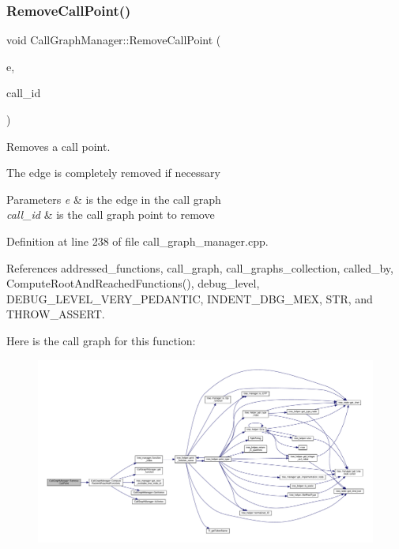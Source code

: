 \subsubsection{\texorpdfstring{Remove\+Call\+Point()}{RemoveCallPoint()}\hspace{0.1cm}{\footnotesize\ttfamily [2/2]}}
{\footnotesize\ttfamily void Call\+Graph\+Manager\+::\+Remove\+Call\+Point (\begin{DoxyParamCaption}\item[{\hyperlink{graph_8hpp_a9eb9afea34e09f484b21f2efd263dd48}{Edge\+Descriptor}}]{e,  }\item[{const unsigned int}]{call\+\_\+id }\end{DoxyParamCaption})}



Removes a call point. 


\begin{DoxyItemize}
\item The edge is completely removed if necessary 
\begin{DoxyParams}{Parameters}
{\em e} & is the edge in the call graph \\
\hline
{\em call\+\_\+id} & is the call graph point to remove \\
\hline
\end{DoxyParams}

\end{DoxyItemize}

Definition at line 238 of file call\+\_\+graph\+\_\+manager.\+cpp.



References addressed\+\_\+functions, call\+\_\+graph, call\+\_\+graphs\+\_\+collection, called\+\_\+by, Compute\+Root\+And\+Reached\+Functions(), debug\+\_\+level, D\+E\+B\+U\+G\+\_\+\+L\+E\+V\+E\+L\+\_\+\+V\+E\+R\+Y\+\_\+\+P\+E\+D\+A\+N\+T\+IC, I\+N\+D\+E\+N\+T\+\_\+\+D\+B\+G\+\_\+\+M\+EX, S\+TR, and T\+H\+R\+O\+W\+\_\+\+A\+S\+S\+E\+RT.

Here is the call graph for this function\+:
\nopagebreak
\begin{figure}[H]
\begin{center}
\leavevmode
\includegraphics[width=350pt]{d5/d96/classCallGraphManager_abbcca062dd81ae6a267d3eabe1a326fb_cgraph}
\end{center}
\end{figure}
\mbox{\label{classCallGraphManager_a89010b404b275f6edc07b8c1f406d842}} 
